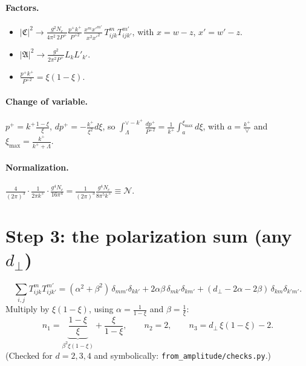 \documentclass[10pt]{article}
\numberwithin{equation}{section}
\newcommand{\mf}[1]{\mathfrak{#1}}
\begin{document}
\paragraph{Factors.}
\begin{itemize}
\item $|\mf C|^2\to\frac{g^2N_c}{4\pi^2\,2P^+}\frac{p^+k^+}{P^{+2}}\,\frac{x^m x'^{m'}}{x^2x'^2}\,T^m_{ijk}T^{m'}_{ijk'}$, with $x=w-z$, $x'=w'-z$.
\item $|\mf A|^2\to\frac{g^2}{2\pi^2P^+}L_kL'_{k'}$.
\item $\frac{p^+k^+}{P^{+2}}=\xi(1-\xi)$.
\end{itemize}
\paragraph{Change of variable.} $p^+=k^+\frac{1-\xi}{\xi}$, $dp^+=-\frac{k^+}{\xi^2}d\xi$, so $\int_\Lambda^{\vee-k^+}\frac{dp^+}{P^{+2}}=\frac{1}{k^+}\int_a^{\xi_{\max}}d\xi$, with $a=\frac{k^+}{\vee}$ and $\xi_{\max}=\frac{k^+}{k^++\Lambda}$.
\paragraph{Normalization.} $\frac{4}{(2\pi)^3}\cdot\frac{1}{2\pi k^+}\cdot\frac{g^4N_c}{16\pi^4}=\frac{1}{(2\pi)^3}\frac{g^4N_c}{8\pi^5k^+}\equiv\mathcal N$.

\section{Step 3: the polarization sum (any $d_\perp$)}
\begin{equation}
\sum_{i,j}T^{m}_{ijk}T^{m'}_{ijk'}=(\alpha^2+\beta^2)\,\delta_{mm'}\delta_{kk'}+2\alpha\beta\,\delta_{mk'}\delta_{km'}+(d_\perp-2\alpha-2\beta)\,\delta_{km}\delta_{k'm'} .
\end{equation}
Multiply by $\xi(1-\xi)$, using $\alpha=\frac{1}{1-\xi}$ and $\beta=\frac1\xi$:
\begin{equation}
n_1=\underbrace{\frac{1-\xi}{\xi}}_{\beta^2\xi(1-\xi)}+\frac{\xi}{1-\xi},\qquad n_2=2,\qquad n_3=d_\perp\,\xi(1-\xi)-2 .
\end{equation}
(Checked for $d=2,3,4$ and symbolically: \texttt{from\_amplitude/checks.py}.)
\end{document}
